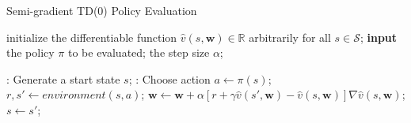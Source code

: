 \documentclass{progartcn}
\begin{document}
	        	\begin{algorithm}[h]
				\caption{Semi-gradient TD(0) Policy Evaluation}
				\label{alg: Semi-gradient TD(0) Policy Evaluation}
				\begin{algorithmic}[1]
					\State initialize the differentiable function $\hat{v}(s,\bm{w})\in\mathbb{R}$ arbitrarily for all $s\in\mathcal{S}$; 
		            \State \textbf{input} the policy $\pi$ to be evaluated; the step size $\alpha$;
		            
		            :
		            	\State Generate a start state $s$;
		            	:
		            		\State Choose action $a\gets\pi(s)$;
		            		\State $r,s'\gets environment(s,a)$;
		            		\State $\bm{w}\gets\bm{w}+\alpha[r+\gamma\hat{v}(s',\bm{w})-\hat{v}(s,\bm{w})]\nabla \hat{v}(s,\bm{w})$;
		            		\State $s\gets s'$;
		            	\EndWhile
		            \EndFor
		        \end{algorithmic}
		        \end{algorithm}
\end{document}
